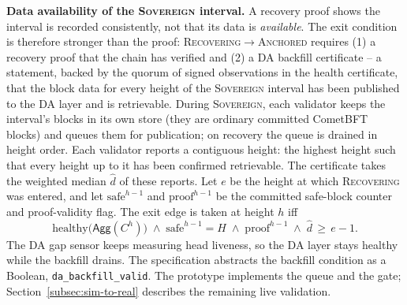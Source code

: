 \textbf{Data availability of the \textsc{Sovereign} interval.} A recovery
proof shows the interval is recorded consistently, not that its data is
\emph{available}. The exit condition is therefore stronger than the proof:
\textsc{Recovering}$\to$\textsc{Anchored} requires (1) a recovery proof that
the chain has verified and (2) a DA backfill certificate -- a statement,
backed by the quorum of signed observations in the health certificate, that
the block data for every height of the \textsc{Sovereign} interval has been
published to the DA layer and is retrievable. During \textsc{Sovereign}, each
validator keeps the interval's blocks in its own store (they are ordinary
committed CometBFT blocks) and queues them for publication; on recovery the
queue is drained in height order. Each validator reports a contiguous height:
the highest height such that every height up to it has been confirmed
retrievable. The certificate takes the weighted median $\widehat d$ of these
reports. Let $e$ be the height at which \textsc{Recovering} was entered, and
let $\mathrm{safe}^{h-1}$ and $\mathrm{proof}^{h-1}$ be the committed
safe-block counter and proof-validity flag. The exit edge is taken at height
$h$ iff
\begin{equation}
\mathrm{healthy}\bigl(\mathsf{Agg}(C^{h})\bigr) \;\wedge\;
\mathrm{safe}^{h-1} = H \;\wedge\; \mathrm{proof}^{h-1} \;\wedge\;
\widehat d \,\ge\, e - 1 .
\label{eq:exit}
\end{equation}
The DA gap sensor keeps measuring head liveness, so the DA layer stays
healthy while the backfill drains. The specification abstracts the backfill
condition as a Boolean, \texttt{da\_backfill\_valid}. The prototype implements
the queue and the gate; Section~\ref{subsec:sim-to-real} describes the
remaining live validation.
